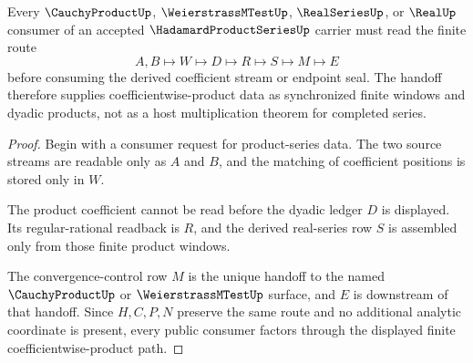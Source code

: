 \begin{theorem}
\label{thm:hadamard-product-series-cauchyproduct-handoff}
Every $\CauchyProductUp$, $\WeierstrassMTestUp$, $\RealSeriesUp$, or
$\RealUp$ consumer of an accepted $\HadamardProductSeriesUp$ carrier must
read the finite route
$$
A,B \longmapsto W \longmapsto D \longmapsto R \longmapsto S \longmapsto M
\longmapsto E
$$
before consuming the derived coefficient stream or endpoint seal. The
handoff therefore supplies coefficientwise-product data as synchronized
finite windows and dyadic products, not as a host multiplication theorem for
completed series.
\end{theorem}
\begin{proof}
Begin with a consumer request for product-series data. The two source streams
are readable only as $A$ and $B$, and the matching of coefficient positions is
stored only in $W$.

The product coefficient cannot be read before the dyadic ledger $D$ is
displayed. Its regular-rational readback is $R$, and the derived real-series
row $S$ is assembled only from those finite product windows.

The convergence-control row $M$ is the unique handoff to the named
$\CauchyProductUp$ or $\WeierstrassMTestUp$ surface, and $E$ is downstream of
that handoff. Since $H,C,P,N$ preserve the same route and no additional
analytic coordinate is present, every public consumer factors through the
displayed finite coefficientwise-product path.
\end{proof}



